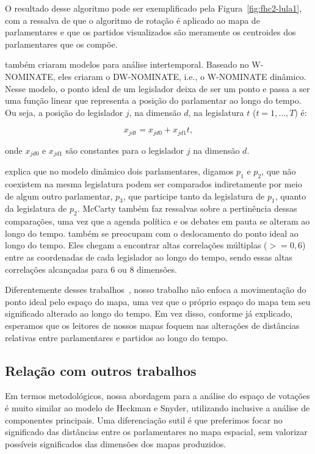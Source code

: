 \documentclass[
	article,			%
	12pt,				%
    twoside,			%
	a4paper,			%
	english,			%
	french,				%
	spanish,			%
	brazil,				%
	]{abntex2}
\newcommand\wnominate{W-NOMINATE\xspace}
\begin{document}
O resultado desse algoritmo pode ser exemplificado pela Figura~\ref{fig:fhc2-lula1}, com a ressalva de que o algoritmo de rotação é aplicado ao mapa de parlamentares e que os partidos visualizados são meramente os centroides dos parlamentares que os compõe.

 também criaram modelos para análise intertemporal. Baseado no \wnominate, eles criaram o DW-NOMINATE, i.e., o \wnominate dinâmico. Nesse modelo, o ponto ideal de um legislador deixa de ser um ponto e passa a ser uma função linear que representa a posição do parlamentar ao longo do tempo. Ou seja, a posição do legislador $j$, na dimensão $d$, na legislatura $t$ ($t=1,...,T$) é:

\begin{equation}
x_{jdt} = x_{jd0} + x_{jd1}t,
\label{eq:dwnominate}
\end{equation}

onde $x_{jd0}$ e $x_{jd1}$ são constantes para o legislador $j$ na dimensão $d$.

 explica que no modelo dinâmico dois parlamentares, digamos $p_1$ e $p_2$, que não coexistem na mesma legislatura podem ser comparados indiretamente por meio de algum outro parlamentar, $p_3$, que participe tanto da legislatura de $p_1$, quanto da legislatura de $p_2$. McCarty também faz ressalvas sobre a pertinência dessas comparações, uma vez que a agenda política e os debates em pauta se alteram ao longo do tempo.
 também se preocupam com o deslocamento do ponto ideal ao longo do tempo. Eles chegam a encontrar altas correlações múltiplas ($>= 0,6$) entre as coordenadas de cada legislador ao longo do tempo, sendo essas altas correlações alcançadas para 6 ou 8 dimensões. 

Diferentemente desses trabalhos~\cite{poole2001dnomiante, heckman-snyder1997}, nosso trabalho não enfoca a movimentação do ponto ideal pelo espaço do mapa, uma vez que o próprio espaço do mapa tem seu significado alterado ao longo do tempo. Em vez disso, conforme já explicado, esperamos que os leitores de nossos mapas foquem nas alterações de distâncias relativas entre parlamentares e partidos ao longo do tempo.


\subsection{Relação com outros trabalhos}

Em termos metodológicos, nossa abordagem para a análise do espaço de votações é muito similar ao modelo de Heckman e Snyder, utilizando inclusive a análise de componentes principais. Uma diferenciação sutil é que preferimos focar no significado das distâncias entre os parlamentares no mapa espacial, sem valorizar possíveis significados das dimensões dos mapas produzidos.
\end{document}
